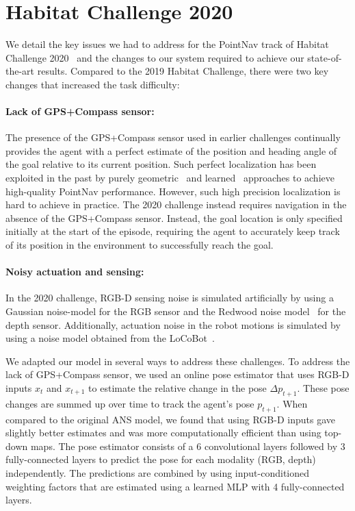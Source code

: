 \documentclass[runningheads]{llncs}
\begin{document}
\section{Habitat Challenge 2020}
\label{sec:habitat_challenge_2020}
We detail the key issues we had to address for the PointNav track of Habitat Challenge 2020~\cite{habitat-challenge} and the changes to our system required to achieve our state-of-the-art results. Compared to the 2019 Habitat Challenge, there were two key changes that increased the task difficulty:

\paragraph{Lack of GPS+Compass sensor:}
The presence of the GPS+Compass sensor used in earlier challenges continually provides the agent with a perfect estimate of the position and heading angle of the goal relative to its current position. Such perfect localization has been exploited in the past by purely geometric~\cite{gupta2017cognitive} and learned~\cite{wijmans2019decentralized} approaches to achieve high-quality PointNav performance. However, such high precision localization is hard to achieve in practice. The 2020 challenge instead requires navigation in the absence of the GPS+Compass sensor. Instead, the goal location is only specified initially at the start of the episode, requiring the agent to accurately keep track of its position in the environment to successfully reach the goal.

\paragraph{Noisy actuation and sensing:} In the 2020 challenge, RGB-D sensing noise is simulated artificially by using a Gaussian noise-model for the RGB sensor and the Redwood noise model~\cite{Choi_2015_CVPR} for the depth sensor. Additionally, actuation noise in the robot motions is simulated by using a noise model obtained from the LoCoBot~\cite{pyrobot2019}.

We adapted our model in several ways to address these challenges. To address the lack of GPS+Compass sensor, we used an online pose estimator that uses RGB-D inputs $x_{t}$ and $x_{t+1}$ to estimate the relative change in the pose $\Delta p_{t+1}$. These pose changes are summed up over time to track the agent's pose $p_{t+1}$. When compared to the original ANS model, we found that using RGB-D inputs gave slightly better estimates and was more computationally efficient than using top-down maps. The pose estimator consists of a 6 convolutional layers followed by 3 fully-connected layers to predict the pose for each modality (RGB, depth) independently. The predictions are combined by using input-conditioned weighting factors that are estimated using a learned MLP with 4 fully-connected layers.
\end{document}
